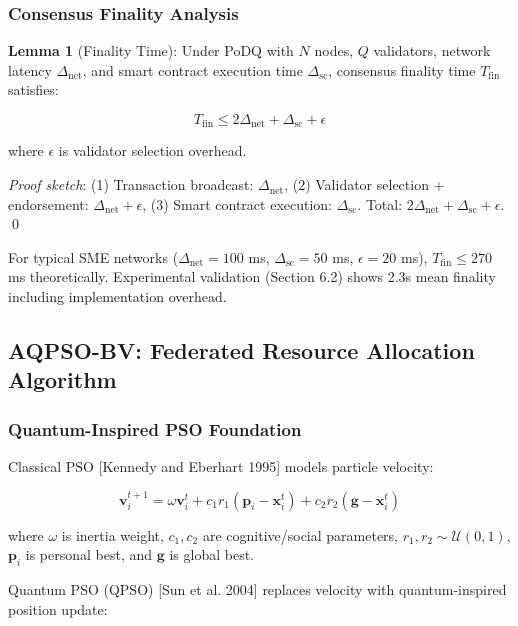 \documentclass[times,10pt,twocolumn]{jucs2e}
\begin{document}
\subsubsection{Consensus Finality Analysis}

\textbf{Lemma 1} (Finality Time): Under PoDQ with $N$ nodes, $Q$ validators, network latency $\Delta_{\text{net}}$, and smart contract execution time $\Delta_{\text{sc}}$, consensus finality time $T_{\text{fin}}$ satisfies:

\begin{equation}
T_{\text{fin}} \leq 2\Delta_{\text{net}} + \Delta_{\text{sc}} + \epsilon
\end{equation}

where $\epsilon$ is validator selection overhead.

\textit{Proof sketch}: (1) Transaction broadcast: $\Delta_{\text{net}}$, (2) Validator selection + endorsement: $\Delta_{\text{net}} + \epsilon$, (3) Smart contract execution: $\Delta_{\text{sc}}$. Total: $2\Delta_{\text{net}} + \Delta_{\text{sc}} + \epsilon$. \qed

For typical SME networks ($\Delta_{\text{net}} = 100$ ms, $\Delta_{\text{sc}} = 50$ ms, $\epsilon = 20$ ms), $T_{\text{fin}} \leq 270$ ms theoretically. Experimental validation (Section 6.2) shows 2.3s mean finality including implementation overhead.

\subsection{AQPSO-BV: Federated Resource Allocation Algorithm}

\subsubsection{Quantum-Inspired PSO Foundation}

Classical PSO [Kennedy and Eberhart 1995] models particle velocity:

\begin{equation}
\mathbf{v}_i^{t+1} = \omega \mathbf{v}_i^t + c_1 r_1 (\mathbf{p}_i - \mathbf{x}_i^t) + c_2 r_2 (\mathbf{g} - \mathbf{x}_i^t)
\end{equation}

where $\omega$ is inertia weight, $c_1, c_2$ are cognitive/social parameters, $r_1, r_2 \sim \mathcal{U}(0,1)$, $\mathbf{p}_i$ is personal best, and $\mathbf{g}$ is global best.

Quantum PSO (QPSO) [Sun et al. 2004] replaces velocity with quantum-inspired position update:
\end{document}
